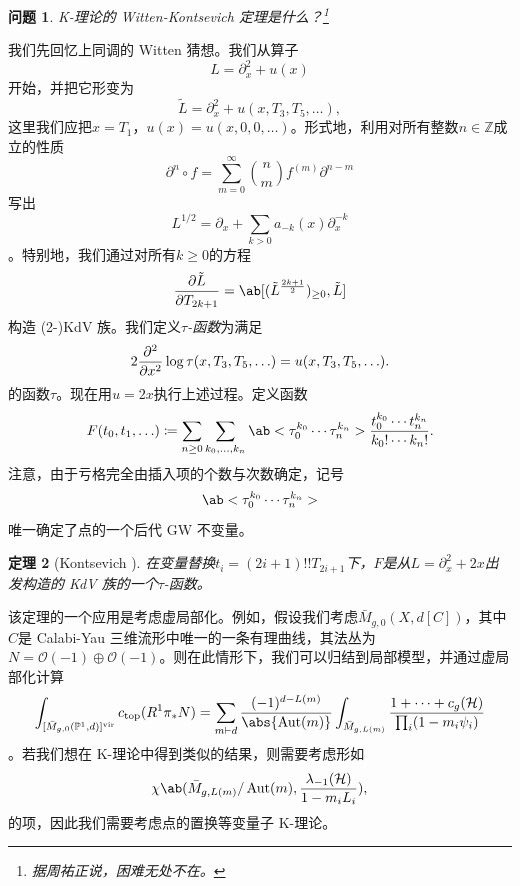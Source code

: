 \documentclass{amsart}
\newtheorem{thm}{定理}[section]
\newtheorem{quest}[thm]{问题}
\theoremstyle{definition}
\theoremstyle{remark}
\theoremstyle{plain}
\theoremstyle{definition}
\theoremstyle{remark}
\newcommand{\Z}{\mathbb{Z}}
\renewcommand{\P}{\mathbb{P}}
\newcommand{\mc}[1]{\mathcal{#1}}
\newcommand{\mr}[1]{\mathrm{#1}}
\newcommand{\1}{\mathbf{1}}
\newcommand{\2}{\mathbf{2}}
\newcommand{\3}{\mathbf{3}}
\newcommand{\vir}{\mr{vir}}
\DeclareMathOperator{\Aut}{Aut}
\begin{document}
\begin{quest}
    K-理论的 Witten-Kontsevich 定理是什么？\footnote{据周祐正说，困难无处不在。}
\end{quest}

我们先回忆上同调的 Witten 猜想。我们从算子
\[ L = \partial_x^2 + u(x) \]
开始，并把它形变为
\[ \tilde{L} = \partial_x^2 + u(x, T_3, T_5, \ldots), \]
这里我们应把\(x = T_1\)，\(u(x) = u(x, 0, 0,\ldots)\)。形式地，利用对所有整数\(n \in \Z\)成立的性质
\[ \partial^n \circ f = \sum_{m = 0}^{\infty} \binom{n}{m} f^{(m)} \partial^{n-m} \]
写出
\[ L^{1/2} = \partial_x + \sum_{k > 0} a_{-k}(x) \partial_x^{-k} \]
。特别地，我们通过对所有\(k \geq 0\)的方程
\[ \pdv{\tilde{L}}{T_{2k+1}} = \ab[(\tilde{L}^{\frac{2k+1}{2}})_{\geq 0}, \tilde{L}] \]
构造 (2-)KdV 族。我们定义\textit{\(\tau\)-函数}为满足
\[ 2 \pdv[2]{}{x}\log \tau(x, T_3, T_5, \ldots) = u(x, T_3, T_5, \ldots). \]
的函数\(\tau\)。现在用\(u = 2x\)执行上述过程。定义函数
\[ F(t_0, t_1, \ldots) \coloneqq \sum_{n \geq 0} \sum_{k_0, \ldots, k_n} \ab<\tau_0^{k_0} \cdots \tau_n^{k_n}> \frac{t_0^{k_0} \cdots t_n^{k_n}}{k_0! \cdots k_n!}. \]
注意，由于亏格完全由插入项的个数与次数确定，记号
\[ \ab<\tau_0^{k_0} \cdots \tau_n^{k_n}> \]
唯一确定了点的一个后代 GW 不变量。

\begin{thm}[Kontsevich {\cite{Kontsevich1992}}]
    在变量替换\(t_i = (2i+1)!! T_{2i+1}\)下，\(F\)是从\(L = \partial_x^2 + 2x\)出发构造的 KdV 族的一个\(\tau\)-函数。
\end{thm}

该定理的一个应用是考虑虚局部化。例如，假设我们考虑\(\bar{M}_{g,0}(X, d[C])\)，其中\(C\)是 Calabi-Yau 三维流形中唯一的一条有理曲线，其法丛为\(N = \mc{O}(-1)\oplus \mc{O}(-1)\)。则在此情形下，我们可以归结到局部模型，并通过虚局部化计算
\begin{align*}
    \int_{[\bar{M}_{g,0}(\P^1, d)]^{\vir}} c_{\mr{top}}(R^1 \pi_* N) = \sum_{m \vdash d} \frac{(-1)^{d-L(m)}}{\abs{\Aut(m)}} \int_{\bar{M}_{g, L(m)}} \frac{1 + \cdots + c_g(\mc{H})}{\prod_i (1-m_i \psi_i)}
\end{align*}
。若我们想在 K-理论中得到类似的结果，则需要考虑形如
\[ \chi\ab(\bar{M}_{g, L(m)}/\Aut(m), \frac{\lambda_{-1}(\mc{H})}{1-m_i L_i}), \]
的项，因此我们需要考虑点的置换等变量子 K-理论。
\end{document}
